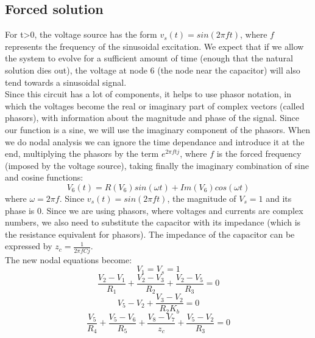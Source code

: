 \subsection{Forced solution}
\label{ssec:fs}
For t\textgreater0, the voltage source has the form $v_s(t)=sin(2 \pi  f t)$, where $f$ represents the frequency of the sinusoidal excitation. We expect that if we allow the system to evolve for a sufficient amount of time (enough that the natural solution dies out), the voltage at node 6 (the node near the capacitor) will also tend towards a sinusoidal signal. \\
Since this circuit has a lot of components, it helps to use phasor notation, in which the voltages become the real or imaginary part of complex vectors (called phasors), with information about the magnitude and phase of the signal. Since our function is a sine, we will use the imaginary component of the phasors. When we do nodal analysis we can ignore the time dependance and introduce it at the end, multiplying the phasors by the term $e^{2 \pi f t j}$, where $f$ is the forced frequency (imposed by the voltage source), taking finally the imaginary combination of sine and cosine functions: \\
\begin{equation}
V_6(t) = R(V_6)sin(\omega t)+Im(V_6)cos(\omega t)
\end{equation}
where $\omega=2\pi f$.
Since  $v_s(t)=sin(2 \pi  f t)$, the magnitude of $V_{s}=1$ and its phase is 0.
Since we are using phasors, where voltages and currents are complex numbers, we also need to substitute the capacitor with its impedance (which is the resistance equivalent for phasors). The impedance of the capacitor can be expressed by $z_{c}=\frac{1}{2 \pi f C j}$. \\
The new nodal equations become: \\
\begin{equation}
    V_{1}=V_{s}=1
\end{equation}
\begin{equation}
  \frac{V_{2}-V_{1}}{R_{1}} +\frac{V_{2}-V_{3}}{R_{2}}+\frac{V_{2}-V_{5}}{R_{3}}=0 
\end{equation}
\begin{equation}
  V_{5}-V_{2}+\frac{V_{3}-V_{2}}{R_{2} K_b}=0
\end{equation}
\begin{equation}
   \frac{V_{5}}{R_{4}} + \frac{V_{5}-V_{6}}{R_{5}}+ \frac{V_{8}-V_{7}}{z_c} + \frac{V_{5}-V_{2}}{R_{3}}=0 
\end{equation}
